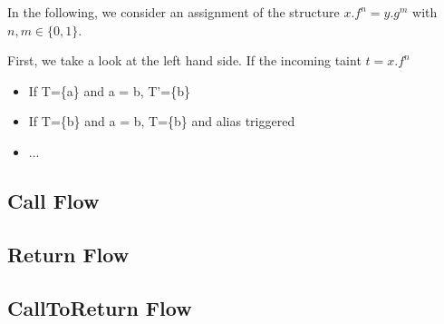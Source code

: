 \documentclass[../draft.tex]{subfiles}
\begin{document}
    In the following, we consider an assignment of the structure $x.f^n=y.g^m$ with $n,m \in \{0,1\}$.
    
    First, we take a look at the left hand side. If the incoming taint $t = x.f^n$
    
    \begin{itemize}
        \item If T=\{a\} and a = b, T'=\{b\}
        \item If T=\{b\} and a = b, T=\{b\} and alias triggered 
        \item ...
    \end{itemize}


    \subsection{Call Flow}

    \subsection{Return Flow}

    \subsection{CallToReturn Flow}
\end{document}
